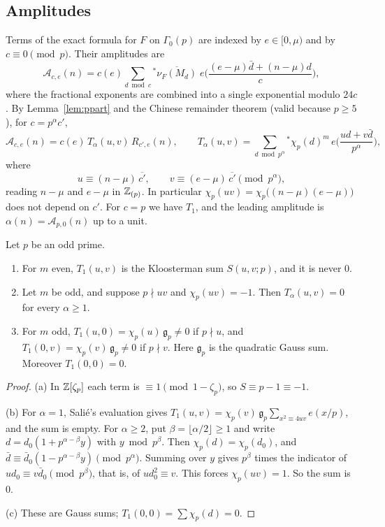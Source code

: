 \documentclass[11pt]{amsart}
\theoremstyle{definition}\newtheorem{definition}[theorem]{Definition}
\theoremstyle{remark}\newtheorem{remark}[theorem]{Remark}
\newcommand{\cA}{\mathcal A}\newcommand{\cK}{\mathcal K}\newcommand{\Gz}{\Gamma_0}
\begin{document}
\subsection{Amplitudes}
Terms of the exact formula for $F$ on $\Gz(p)$ are indexed by $e\in[0,\mu)$ and by $c\equiv0\pmod p$. Their amplitudes are
\begin{equation}\label{eq:Kp}
\cA_{c,e}(n)=c(e)\sum_{d\bmod c}{}^{*}\overline{\nu_F(M_d)}\;e\Big(\frac{(e-\mu)\bar d+(n-\mu)d}{c}\Big),
\end{equation}
where the fractional exponents are combined into a single exponential modulo $24c$. By Lemma~\ref{lem:ppart} and the Chinese remainder theorem (valid because $p\ge5$), for $c=p^\alpha c'$,
\begin{equation}\label{eq:factor}
\cA_{c,e}(n)=c(e)\,T_\alpha(u,v)\,R_{c',e}(n),\qquad T_\alpha(u,v)=\sum_{d\bmod p^\alpha}{}^{*}\chi_p(d)^m\,e\Big(\frac{ud+v\bar d}{p^\alpha}\Big),
\end{equation}
where
\[
u\equiv(n-\mu)\,\overline{c'},\qquad v\equiv(e-\mu)\,\overline{c'}\pmod{p^\alpha},
\]
reading $n-\mu$ and $e-\mu$ in $\mathbb Z_{(p)}$. In particular $\chi_p(uv)=\chi_p\big((n-\mu)(e-\mu)\big)$ does not depend on $c'$. For $c=p$ we have $T_1$, and the leading amplitude is $\alpha(n)=\cA_{p,0}(n)$ up to a unit.

\begin{lemma}\label{lem:salie}
Let $p$ be an odd prime.
\begin{enumerate}[label=(\alph*),leftmargin=2em]
\item For $m$ even, $T_1(u,v)$ is the Kloosterman sum $S(u,v;p)$, and it is never $0$.
\item Let $m$ be odd, and suppose $p\nmid uv$ and $\chi_p(uv)=-1$. Then $T_\alpha(u,v)=0$ for every $\alpha\ge1$.
\item For $m$ odd, $T_1(u,0)=\chi_p(u)\,\mathfrak g_p\ne0$ if $p\nmid u$, and $T_1(0,v)=\chi_p(v)\,\mathfrak g_p\ne0$ if $p\nmid v$. Here $\mathfrak g_p$ is the quadratic Gauss sum. Moreover $T_1(0,0)=0$.
\end{enumerate}
\end{lemma}
\begin{proof}
(a) In $\mathbb Z[\zeta_p]$ each term is $\equiv1\pmod{1-\zeta_p}$, so $S\equiv p-1\equiv-1$.

(b) For $\alpha=1$, Sali\'e's evaluation gives $T_1(u,v)=\chi_p(v)\,\mathfrak g_p\sum_{x^2\equiv4uv}e(x/p)$, and the sum is empty. For $\alpha\ge2$, put $\beta=\lfloor\alpha/2\rfloor\ge1$ and write $d=d_0(1+p^{\alpha-\beta}y)$ with $y\bmod p^\beta$. Then $\chi_p(d)=\chi_p(d_0)$, and $\bar d\equiv\bar d_0(1-p^{\alpha-\beta}y)\pmod{p^\alpha}$. Summing over $y$ gives $p^\beta$ times the indicator of $ud_0\equiv v\bar d_0\pmod{p^\beta}$, that is, of $ud_0^2\equiv v$. This forces $\chi_p(uv)=1$. So the sum is $0$.

(c) These are Gauss sums; $T_1(0,0)=\sum\chi_p(d)=0$.
\end{proof}
\end{document}
